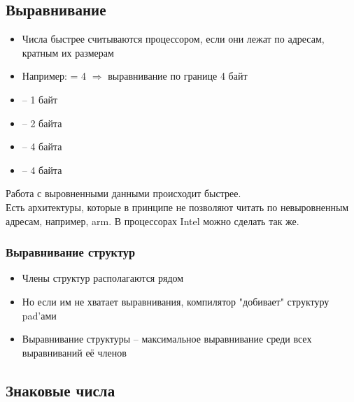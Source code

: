   \subsection{Выравнивание}
    \begin{itemize}
      \item Числа быстрее считываются процессором, если они лежат по адресам, кратным их размерам
      \item Например:  = 4 $\Rightarrow$ выравнивание по границе 4 байт
      \item {} -- 1 байт
      \item {} -- 2 байта
      \item {} -- 4 байта
      \item {} -- 4 байта
    \end{itemize}
    
    Работа с выровненными данными происходит быстрее.\\
    Есть архитектуры, которые в принципе не позволяют читать по невыровненным адресам, например, arm. В процессорах Intel можно сделать так же.
    
  \subsubsection{Выравнивание структур}
    \begin{itemize}
      \item Члены структур располагаются рядом
      \item Но если им не хватает выравнивания, компилятор "добивает" структуру pad'ами
      \item Выравнивание структуры -- максимальное выравнивание среди всех выравниваний её членов
    \end{itemize}
    
  \subsection{Знаковые числа}
